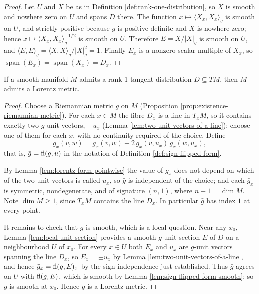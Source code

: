 \begin{proof}
\leanok
{}
Let $U$ and $X$ be as in Definition \ref{def:rank-one-distribution}, so $X$ is smooth and nowhere zero on $U$ and spans $D$ there. The function $x \mapsto \langle X_x, X_x\rangle_g$ is smooth on $U$, and strictly positive because $g$ is positive definite and $X$ is nowhere zero; hence $x \mapsto \langle X_x, X_x\rangle_g^{-1/2}$ is smooth on $U$. Therefore $E = X/|X|_g$ is smooth on $U$, and $\langle E,E\rangle_g = \langle X,X\rangle_g / |X|_g^2 = 1$. Finally $E_x$ is a nonzero scalar multiple of $X_x$, so $\operatorname{span}(E_x) = \operatorname{span}(X_x) = D_x$.
\end{proof}

\begin{proposition}
\label{prop:lorentz-metric-of-rank-one-distribution}
\leanok
{}
If a smooth manifold $M$ admits a rank-1 tangent distribution $D \subseteq TM$, then $M$ admits a Lorentz metric.
\end{proposition}

\begin{proof}
\leanok
{}
Choose a Riemannian metric $g$ on $M$ (Proposition \ref{prop:existence-riemannian-metric}). For each $x \in M$ the fibre $D_x$ is a line in $T_xM$, so it contains exactly two $g$-unit vectors, $\pm u_x$ (Lemma \ref{lem:two-unit-vectors-of-a-line}); choose one of them for each $x$, with no continuity required of the choice. Define
\[
  \bar{g}_x(v,w) = g_x(v,w) - 2\,g_x(v,u_x)\,g_x(w,u_x),
\]
that is, $\bar g = \operatorname{fl}(g,u)$ in the notation of Definition \ref{def:sign-flipped-form}.

By Lemma \ref{lem:lorentz-form-pointwise} the value of $\bar g_x$ does not depend on which of the two unit vectors is called $u_x$, so $\bar{g}$ is independent of the choice; and each $\bar{g}_x$ is symmetric, nondegenerate, and of signature $(n,1)$, where $n+1 = \dim M$. Note $\dim M \geq 1$, since $T_xM$ contains the line $D_x$. In particular $\bar{g}$ has index $1$ at every point.

It remains to check that $\bar{g}$ is smooth, which is a local question. Near any $x_0$, Lemma \ref{lem:local-unit-section} provides a smooth $g$-unit section $E$ of $D$ on a neighbourhood $U$ of $x_0$. For every $x \in U$ both $E_x$ and $u_x$ are $g$-unit vectors spanning the line $D_x$, so $E_x = \pm u_x$ by Lemma \ref{lem:two-unit-vectors-of-a-line}, and hence $\bar g_x = \operatorname{fl}(g,E)_x$ by the sign-independence just established. Thus $\bar g$ agrees on $U$ with $\operatorname{fl}(g,E)$, which is smooth by Lemma \ref{lem:sign-flipped-form-smooth}; so $\bar g$ is smooth at $x_0$. Hence $\bar{g}$ is a Lorentz metric.
\end{proof}


